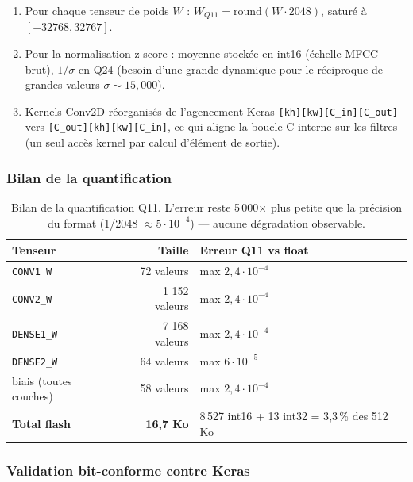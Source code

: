 \begin{enumerate}
    \item Pour chaque tenseur de poids $W$ : $W_{Q11} = \text{round}(W \cdot 2048)$, saturé à $[-32768, 32767]$.
    \item Pour la normalisation z-score : moyenne stockée en int16 (échelle MFCC brut), $1 / \sigma$ en Q24 (besoin d'une grande dynamique pour le réciproque de grandes valeurs $\sigma \sim 15{,}000$).
    \item Kernels Conv2D réorganisés de l'agencement Keras \texttt{[kh][kw][C\_in][C\_out]} vers \texttt{[C\_out][kh][kw][C\_in]}, ce qui aligne la boucle C interne sur les filtres (un seul accès kernel par calcul d'élément de sortie).
\end{enumerate}

\subsubsection{Bilan de la quantification}

\begin{table}[H]
\centering
\small
\begin{tabularx}{0.85\linewidth}{@{}l r X@{}}
\toprule
\textbf{Tenseur} & \textbf{Taille} & \textbf{Erreur Q11 vs float} \\
\midrule
\texttt{CONV1\_W}      &    72 valeurs & max $2{,}4 \cdot 10^{-4}$ \\
\texttt{CONV2\_W}      & 1 152 valeurs & max $2{,}4 \cdot 10^{-4}$ \\
\texttt{DENSE1\_W}     & 7 168 valeurs & max $2{,}4 \cdot 10^{-4}$ \\
\texttt{DENSE2\_W}     &    64 valeurs & max $6 \cdot 10^{-5}$ \\
biais (toutes couches) &    58 valeurs & max $2{,}4 \cdot 10^{-4}$ \\
\midrule
\textbf{Total flash}   & \textbf{16{,}7 Ko} & 8\,527 int16 + 13 int32 = 3{,}3\,\% des 512 Ko \\
\bottomrule
\end{tabularx}
\caption{Bilan de la quantification Q11. L'erreur reste 5\,000$\times$ plus petite que la précision du format (1/2048 $\approx 5 \cdot 10^{-4}$) --- aucune dégradation observable.}
\label{tab:fp6-quant}
\end{table}

\subsubsection{Validation bit-conforme contre Keras}

